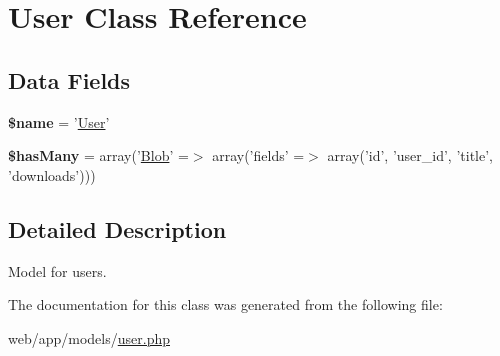 \hypertarget{class_user}{
\section{User Class Reference}
\label{class_user}
}
\subsection*{Data Fields}
\begin{DoxyCompactItemize}
\item 
\hypertarget{class_user_ab2fc40d43824ea3e1ce5d86dee0d763b}{
{\bfseries \$name} = '\hyperlink{class_user}{User}'}
\label{class_user_ab2fc40d43824ea3e1ce5d86dee0d763b}

\item 
\hypertarget{class_user_aa305c51f2c9efc1703200b92523e97fb}{
{\bfseries \$hasMany} = array('\hyperlink{class_blob}{Blob}' =$>$ array('fields' =$>$ array('id', 'user\_\-id', 'title', 'downloads')))}
\label{class_user_aa305c51f2c9efc1703200b92523e97fb}

\end{DoxyCompactItemize}


\subsection{Detailed Description}
Model for users. 

The documentation for this class was generated from the following file:\begin{DoxyCompactItemize}
\item 
web/app/models/\hyperlink{user_8php}{user.php}\end{DoxyCompactItemize}
